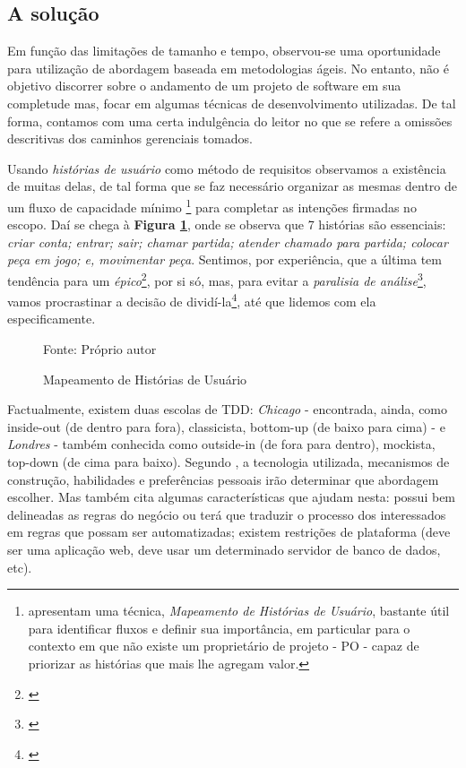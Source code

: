 \subsection{A solução}

  Em função das limitações de tamanho e tempo, observou-se uma oportunidade para utilização de abordagem baseada em metodologias ágeis. No entanto, não é objetivo discorrer sobre o andamento de um projeto de software em sua completude mas, focar em algumas técnicas de desenvolvimento utilizadas. De tal forma, contamos com uma certa indulgência do leitor no que se refere a omissões descritivas dos caminhos gerenciais tomados.

  Usando \emph{histórias de usuário} como método de requisitos observamos a existência de muitas delas, de tal forma que se faz necessário organizar as mesmas dentro de um fluxo de capacidade mínimo \footnote{ apresentam uma técnica, \emph{Mapeamento de Histórias de Usuário}, bastante útil para identificar fluxos e definir sua importância, em particular para o contexto em que não existe um proprietário de projeto - PO - capaz de priorizar as histórias que mais lhe agregam valor.} para completar as intenções firmadas no escopo. Daí se chega à \textbf{Figura \ref{fig:mapeamento-historias-usuario}}, onde se observa que 7 histórias são essenciais: \emph{criar conta; entrar; sair; chamar partida; atender chamado para partida; colocar peça em jogo; e, movimentar peça}. Sentimos, por experiência, que a última tem tendência para um \emph{épico}\footnote{\cite[pág. 6]{Cohn2004}}, por si só, mas,  para evitar a \emph{paralisia de análise}\footnote{\cite[pág. 71]{Pugh2011}}, vamos procrastinar a decisão de dividí-la\footnote{\cite[pág. 24]{Cohn2004}}, até que lidemos com ela especificamente.

  \begin{figure}[h]
    \centering
    \caption{Mapeamento de Histórias de Usuário}
    Fonte: Próprio autor
    \label{fig:mapeamento-historias-usuario}
  \end{figure}

  Factualmente, existem duas escolas de TDD: \emph{Chicago} - encontrada, ainda, como inside-out (de dentro para fora), classicista, bottom-up (de baixo para cima) - e \emph{Londres} - também conhecida como outside-in (de fora para dentro), mockista, top-down (de cima para baixo). Segundo , a tecnologia utilizada, mecanismos de construção, habilidades e preferências pessoais irão determinar que abordagem escolher. Mas também cita algumas características que ajudam nesta: possui bem delineadas as regras do negócio ou terá que traduzir o processo dos interessados em regras que possam ser automatizadas; existem restrições de plataforma (deve ser uma aplicação web, deve usar um determinado servidor de banco de dados, etc).

